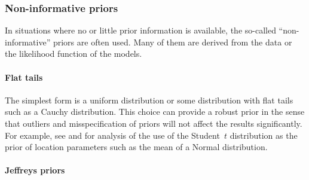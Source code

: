 \subsubsection{Non-informative priors}
\label{ssub:Non-informative priors}

In situations where no or little prior information is available, the so-called ``non-informative'' priors are often used. Many of them are derived from the data or the likelihood function of the models.

\paragraph{Flat tails}

The simplest form is a uniform distribution or some distribution with flat tails such as a Cauchy distribution. This choice can provide a robust prior in the sense that outliers and misspecification of priors will not affect the results significantly. For example, see \cite{OHagan:1990vx} and \cite{Fan:1992vx} for analysis of the use of the Student~$t$ distribution as the prior of location parameters such as the mean of a Normal distribution.

\paragraph{Jeffreys priors}

